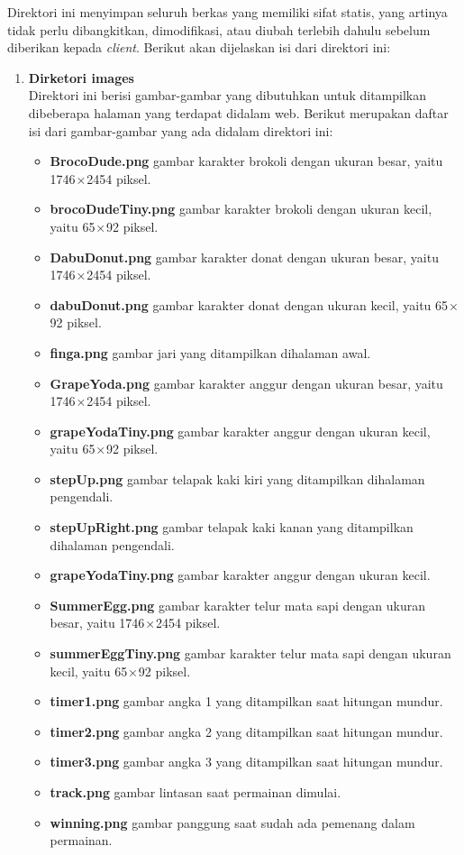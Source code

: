 \begin{enumerate}
	Direktori ini menyimpan seluruh berkas yang memiliki sifat statis, yang artinya tidak perlu dibangkitkan, dimodifikasi, atau diubah terlebih dahulu sebelum diberikan kepada \textit{client}. Berikut akan dijelaskan isi dari direktori ini:
	\begin{enumerate}
		\item \textbf{Dirketori images} \\
		Direktori ini berisi gambar-gambar yang dibutuhkan untuk ditampilkan dibeberapa halaman yang terdapat didalam web. Berikut merupakan daftar isi dari gambar-gambar yang ada didalam direktori ini: 
		\begin{itemize}
			\item \textbf{BrocoDude.png} gambar karakter brokoli dengan ukuran besar, yaitu 1746 × 2454 piksel.
			\item \textbf{brocoDudeTiny.png} gambar karakter brokoli dengan ukuran kecil, yaitu 65 × 92 piksel.
			\item \textbf{DabuDonut.png} gambar karakter donat dengan ukuran besar, yaitu 1746 × 2454 piksel.
			\item \textbf{dabuDonut.png} gambar karakter donat dengan ukuran kecil, yaitu 65 × 92 piksel.
			\item \textbf{finga.png} gambar jari yang ditampilkan dihalaman awal.
			\item \textbf{GrapeYoda.png} gambar karakter anggur dengan ukuran besar, yaitu 1746 × 2454 piksel.
			\item \textbf{grapeYodaTiny.png} gambar karakter anggur dengan ukuran kecil, yaitu 65 × 92 piksel.
			\item \textbf{stepUp.png} gambar telapak kaki kiri yang ditampilkan dihalaman pengendali.
			\item \textbf{stepUpRight.png} gambar telapak kaki kanan yang ditampilkan dihalaman pengendali.
			\item \textbf{grapeYodaTiny.png} gambar karakter anggur dengan ukuran kecil.
			\item \textbf{SummerEgg.png} gambar karakter telur mata sapi dengan ukuran besar, yaitu 1746 × 2454 piksel.
			\item \textbf{summerEggTiny.png} gambar karakter telur mata sapi dengan ukuran kecil, yaitu 65 × 92 piksel.
			\item \textbf{timer1.png} gambar angka 1 yang ditampilkan saat hitungan mundur.
			\item \textbf{timer2.png} gambar angka 2 yang ditampilkan saat hitungan mundur.
			\item \textbf{timer3.png} gambar angka 3 yang ditampilkan saat hitungan mundur.
			\item \textbf{track.png} gambar lintasan saat permainan dimulai.
			\item \textbf{winning.png} gambar panggung saat sudah ada pemenang dalam permainan.
		\end{itemize}
	

\end{enumerate}
\end{enumerate}
